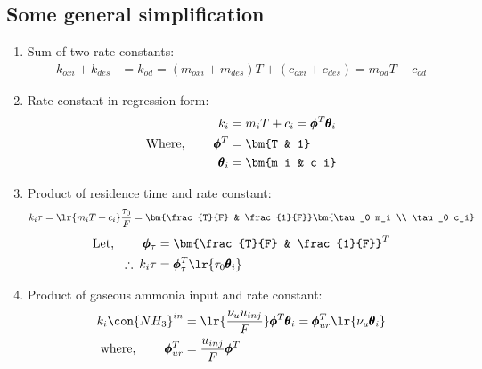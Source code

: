 \subsection{Some general simplification}
\begin{enumerate}
        \item Sum of two rate constants:
        \begin{align}
                k_{oxi} + k_{des} &= k_{od} = (m_{oxi} + m_{des}) T + (c_{oxi} + c_{des}) = m_{od} T + c_{od} \label{eqn::k_sum}
        \end{align}

        \item Rate constant in regression form:
        \begin{align}
                k_i &= m_i T + c_i = \pmb \phi^T \pmb \theta_i\\
                \text{Where, } \qquad \pmb \phi^T &= \bm{T & 1}       \label{eqn::phi_i}\\
                                      \pmb \theta_i &= \bm{m_i & c_i} \label{eqn::theta_i}
        \end{align}

        \item Product of residence time and rate constant:
        \begin{align*}
        k_i \tau  = \lr{m_i T + c_i} \frac{\tau_0}{F} = \bm{\frac{T}{F} & \frac{1}{F}} \bm{\tau_0 m_i \\ \tau_0 c_i}
        \end{align*}
        \begin{align}
                \text{Let, } \qquad \pmb \phi_\tau &= \bm{\frac{T}{F} & \frac{1}{F}}^T  \label{eqn::phi_tau}\\
                \therefore \: k_i \tau &= \pmb \phi_\tau^T \lr{\tau_0 \pmb \theta_i}   \label{eqn::tau_ki}
        \end{align}

        \item Product of gaseous ammonia input and rate constant:
        \begin{align}
                k_{i} \con{NH_3}^{in} &= \lr{\frac{\nu_u u_{inj}}{F}} \pmb \phi^T \pmb \theta_i
                                       = \pmb \phi_{ur}^T \lr{\nu_u \pmb \theta_i}              \label{eqn::k_nh3}\\
                \text{where, } \qquad \pmb \phi_{ur}^T &= \frac{u_{inj}}{F} \pmb \phi^T         \label{eqn::phi_ur}
        \end{align}


\end{enumerate}
